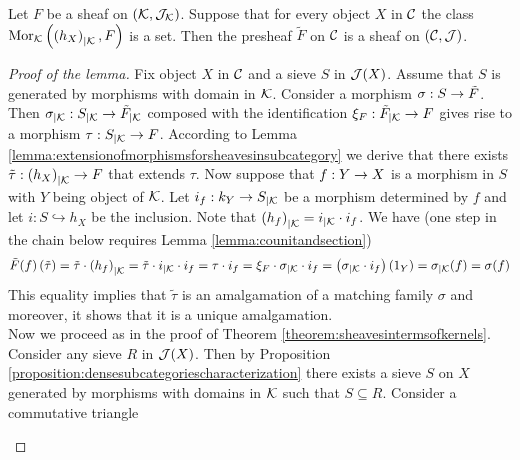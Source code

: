 \begin{lemma}\label{lemma:extensionofsheafissheaf}
Let $F$ be a sheaf on $({\mathcal K},{\mathcal J}_{{\mathcal K}})$. Suppose that for every object $X$ in ${\mathcal C}$ the class $\mathrm{Mor}_{{\mathcal K}}\left(\left(h_X\right)_{\mid {\mathcal K}},F\right)$ is a set. Then the presheaf $\tilde{F}$ on ${\mathcal C}$ is a sheaf on $({\mathcal C},{\mathcal J})$.
\end{lemma}
\begin{proof}[Proof of the lemma]
Fix object $X$ in ${\mathcal C}$ and a sieve $S$ in ${\mathcal J}(X)$. Assume that $S$ is generated by morphisms with domain in ${\mathcal K}$. Consider a morphism $\sigma:S\rightarrow \tilde{F}$. Then $\sigma_{\mid {\mathcal K}}:S_{\mid {\mathcal K}}\rightarrow \tilde{F}_{\mid {\mathcal K}}$ composed with the identification $\xi_F:\tilde{F}_{\mid {\mathcal K}}\rightarrow F$ gives rise to a morphism $\tau:S_{\mid {\mathcal K}}\rightarrow F$. According to Lemma \ref{lemma:extensionofmorphismsforsheavesinsubcategory} we derive that there exists $\tilde{\tau}:\left(h_X\right)_{\mid {\mathcal K}}\rightarrow F$ that extends $\tau$. Now suppose that $f:Y\rightarrow X$ is a morphism in $S$ with $Y$ being object of ${\mathcal K}$. Let $i_f:k_Y\rightarrow S_{\mid {\mathcal K}}$ be a morphism determined by $f$ and let $i:S\hookrightarrow h_X$ be the inclusion. Note that $\left(h_f\right)_{\mid {\mathcal K}} = i_{\mid {\mathcal K}}\cdot i_f$. We have (one step in the chain below requires Lemma \ref{lemma:counitandsection})
$$\tilde{F}(f)\left(\tilde{\tau}\right) =\tilde{\tau}\cdot \left(h_f\right)_{\mid {\mathcal K}} = \tilde{\tau}\cdot i_{\mid {\mathcal K}}\cdot i_{f} = \tau\cdot i_{f} = \xi_F\cdot \sigma_{\mid {\mathcal K}}\cdot i_f = \left( \sigma_{\mid {\mathcal K}}\cdot i_f \right)(1_Y) = \sigma_{\mid {\mathcal K}}(f) = \sigma(f)$$
This equality implies that $\tilde{\tau}$ is an amalgamation of a matching family $\sigma$ and moreover, it shows that it is a unique amalgamation.\\
Now we proceed as in the proof of Theorem \ref{theorem:sheavesintermsofkernels}. Consider any sieve $R$ in ${\mathcal J}(X)$. Then by Proposition \ref{proposition:densesubcategoriescharacterization} there exists a sieve $S$ on $X$ generated by morphisms with domains in ${\mathcal K}$ such that $S\subseteq R$. Consider a commutative triangle
\begin{center}
\end{center}
\end{proof}
